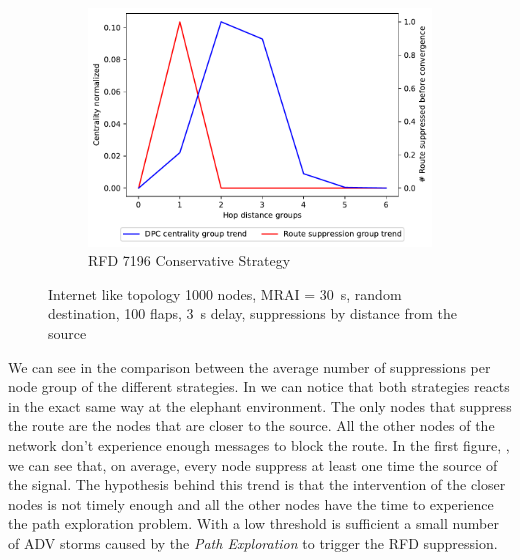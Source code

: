 \begin{figure}[h]
     \hfill
     \begin{subfigure}[b]{0.325\textwidth}
         \centering
         \includegraphics[width=\textwidth]{images/RFD/miceVSelephants/elephants/cisco_1000_RFD_7196_conservative_nodeConvergence_centVSsup_trend.pdf}
         \caption{RFD 7196 Conservative Strategy}
         \label{fig:1000_7196RFDC_cent_VS_sup_elephants}
     \end{subfigure}
		\caption{Internet like topology \num{1000} nodes, \ac{MRAI} = \SI{30}{\second}, 
		random destination, \num{100} flaps, \SI{3}{\second} delay, suppressions 
		by distance from the source}
        \label{fig:1000_RFD_cent_VS_sup_elephants}
\end{figure}

We can see in  the comparison between
the average number of suppressions per node group of the different strategies.
In 
we can notice that both strategies reacts in the exact same way at the elephant
environment.
The only nodes that suppress the route are the nodes that are closer to the source.
All the other nodes of the network don't experience enough messages to block 
the route.
In the first figure, , we can see
that, on average, every node suppress at least one time the source of the
signal.
The hypothesis behind this trend is that the intervention of the closer nodes
is not timely enough and all the other nodes have the time to experience the
path exploration problem.
With a low threshold is sufficient a small number of \ac{ADV} storms caused
by the \textit{Path Exploration} to trigger the \ac{RFD} suppression.


